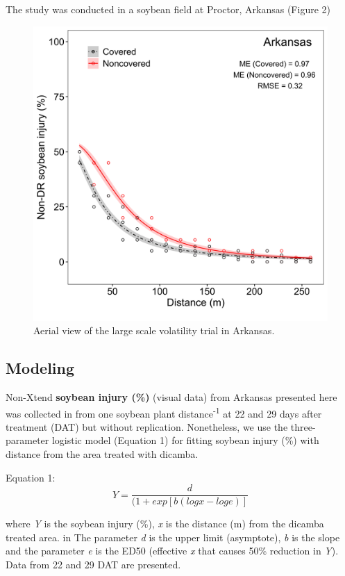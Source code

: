 \documentclass[]{article}
\begin{document}
The study was conducted in a soybean field at Proctor, Arkansas (Figure
2)

\begin{figure}[h]

{\centering \includegraphics[width=1\linewidth]{Arkansas} 

}

\caption{Aerial view of the large scale volatility trial in Arkansas.}\label{fig:unnamed-chunk-7}
\end{figure}

\newpage

\subsection{Modeling}\label{modeling}

Non-Xtend \textbf{soybean injury (\%)} (visual data) from Arkansas
presented here was collected in from one soybean plant
distance\textsuperscript{-1} at 22 and 29 days after treatment (DAT) but
without replication. Nonetheless, we use the three-parameter logistic
model (Equation 1) for fitting soybean injury (\%) with distance from
the area treated with dicamba.

Equation 1: \[Y= \frac{d}{(1 + exp[b(logx - loge)]} \]

where \emph{Y} is the soybean injury (\%), \emph{x} is the distance (m)
from the dicamba treated area. in The parameter \emph{d} is the upper
limit (asymptote), \emph{b} is the slope and the parameter \emph{e} is
the ED50 (effective \emph{x} that causes 50\% reduction in \emph{Y}).
Data from 22 and 29 DAT are presented.
\end{document}
